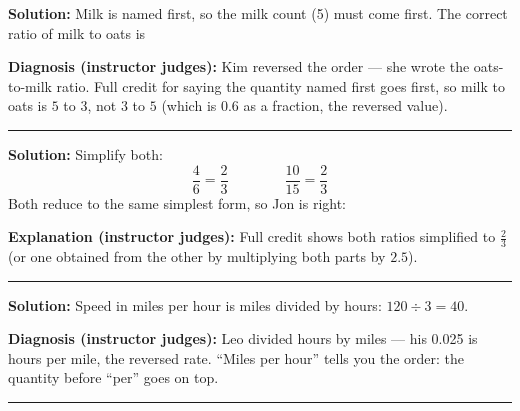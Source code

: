 \documentclass[12pt]{article}
\begin{document}



\textbf{Solution:} Milk is named first, so the milk count (5) must come first.
The correct ratio of milk to oats is 

\textbf{Diagnosis (instructor judges):} Kim reversed the order — she wrote the
oats-to-milk ratio. Full credit for saying the quantity named first goes first,
so milk to oats is $5$ to $3$, not $3$ to $5$ (which is $0.6$ as a fraction, the
reversed value).

\vspace{0.3cm}\noindent\rule{\linewidth}{0.2pt}\vspace{0.3cm}


\textbf{Solution:} Simplify both:
\[ \frac{4}{6} = \frac{2}{3} \qquad\qquad \frac{10}{15} = \frac{2}{3} \]
Both reduce to the same simplest form, so Jon is right:

\textbf{Explanation (instructor judges):} Full credit shows both ratios
simplified to $\frac{2}{3}$ (or one obtained from the other by multiplying both
parts by $2.5$).

\vspace{0.3cm}\noindent\rule{\linewidth}{0.2pt}\vspace{0.3cm}


\textbf{Solution:} Speed in miles per hour is miles divided by hours:
$120 \div 3 = 40$. 

\textbf{Diagnosis (instructor judges):} Leo divided hours by miles — his 0.025
is hours per mile, the reversed rate. ``Miles per hour'' tells you the order:
the quantity before ``per'' goes on top.

\vspace{0.3cm}\noindent\rule{\linewidth}{0.2pt}\vspace{0.3cm}

\end{document}

